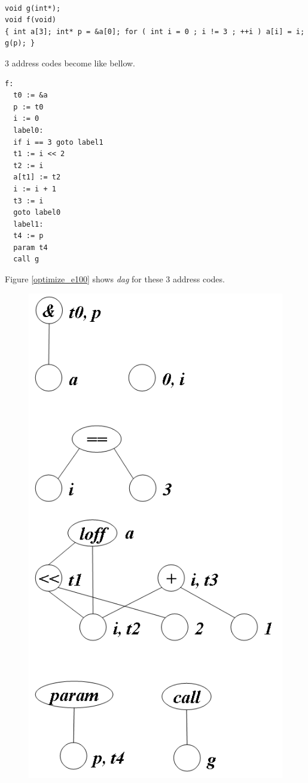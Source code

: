 \begin{Example}
\label{optimize_e099}
\begin{verbatim}

void g(int*);
void f(void)
{ int a[3]; int* p = &a[0]; for ( int i = 0 ; i != 3 ; ++i ) a[i] = i; g(p); }
\end{verbatim}
3 address codes become like bellow.
\begin{verbatim}
f:
  t0 := &a
  p := t0
  i := 0
  label0:
  if i == 3 goto label1
  t1 := i << 2
  t2 := i
  a[t1] := t2
  i := i + 1
  t3 := i
  goto label0
  label1:
  t4 := p
  param t4
  call g
\end{verbatim}
Figure \ref{optimize_e100} shows {\em dag} for these 3 address codes.
\begin{figure}[htbp]
\begin{center}
\begin{htmlonly}
\includegraphics[width=0.619\linewidth,height=1.2\linewidth]{opt043.png}
\end{htmlonly}
\begin{latexonly}

\end{latexonly}
\end{center}
\end{figure}
\end{Example}
